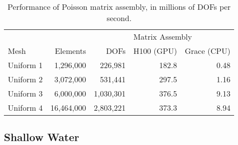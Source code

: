 \begin{table}[t]
    \centering
\begin{tabular}{lrrrr}
\toprule
          &          &             & \multicolumn{2}{l}{Matrix Assembly} \\
                                     \cmidrule(lr){4-5}
Mesh      & Elements & DOFs        & H100 (GPU) & Grace (CPU) \\
\midrule
Uniform 1 &  1,296,000 &   226,981 & 182.8 & 0.48 \\
Uniform 2 &  3,072,000 &   531,441 & 297.5 & 1.16 \\
Uniform 3 &  6,000,000 & 1,030,301 & 376.5 & 9.13 \\
Uniform 4 & 16,464,000 & 2,803,221 & 373.3 & 8.94 \\
\bottomrule
\end{tabular}
\caption{Performance of Poisson matrix assembly, in millions of DOFs per second.}
    \label{tab:poisson_results}
\end{table}


\subsection*{Shallow Water}

